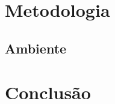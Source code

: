 \documentclass[12pt]{article}
\begin{document}
	\section{Metodologia}
		\subsection{Ambiente}
		
	\section{Conclusão}

\begin{comment}	
	
	Texto com exemplo de referência a Tabela~\ref{tab:tarefas}.
	
	\begin{table}[ht]
	\centering
	\caption{Exemplo de tabela}
	\label{tab:tarefas}
	\begin{tabular}{ p{3cm}|p{6cm}|c }
	\multicolumn{3}{c}{Título do projeto} \\
	\hline
	Coluna 1 & Coluna 2 & Coluna 3\\
	\hline
	\multirow{3}{3cm}{Linha 1, coluna 1}  & Linha 1, coluna 2 & Linha 1, coluna 3\\
	& Linha 1.2, coluna 2 & Linha 1.2, coluna 3 \\
	& Linha 1.3, coluna 2 & Linha 1.3, coluna 3 \\
	\hline
	\multirow{3}{3cm}{Linha 2, coluna 1} & Linha 2, coluna 2 & Linha 2, coluna 3 \\
	& Linha 2.2, coluna 2 & Linha 2.2, coluna 3 \\
	& Linha 2.3, coluna 2 & Linha 2.3, coluna 3 \\
	\hline
	\end{tabular}
	\end{table}
	
	Texto da terceira subseção com exemplo de referência a Figura~\ref{fig:exemplo}.
	
	\begin{figure}[ht]
	\centering
	\texttt{[image: triangulo\_quadrado\_circulo.jpg]}
	\caption{Figura de exemplo}
	\label{fig:exemplo}
	\end{figure}
	
\end{comment}
	
		
\end{document}
